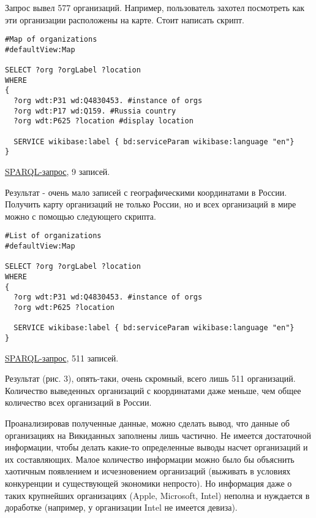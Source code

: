 Запрос вывел 577 организаций. Например, пользователь захотел посмотреть как эти организации расположены на карте. Стоит написать скрипт.

\begin{lstlisting}[language=SPARQL]
#Map of organizations 
#defaultView:Map

SELECT ?org ?orgLabel ?location
WHERE
{
  ?org wdt:P31 wd:Q4830453. #instance of orgs
  ?org wdt:P17 wd:Q159. #Russia country
  ?org wdt:P625 ?location #display location

  SERVICE wikibase:label { bd:serviceParam wikibase:language "en"}
}
\end{lstlisting}

\href{https://query.wikidata.org/#%23List%20of%20organisations%20%0A%23defaultView%3AMap%0A%0ASELECT%20%3Forg%20%3ForgLabel%20%3Flocation%0AWHERE%0A%7B%0A%20%20%3Forg%20wdt%3AP31%20wd%3AQ4830453.%20%23instance%20of%20orgs%0A%20%20%3Forg%20wdt%3AP17%20wd%3AQ159.%20%23Russia%20country%0A%20%20%3Forg%20wdt%3AP625%20%3Flocation%0A%0A%20%20SERVICE%20wikibase%3Alabel%20%7B%20bd%3AserviceParam%20wikibase%3Alanguage%20%22en%22%7D%0A%7D}{SPARQL-запрос}, 9 записей.

Результат - очень мало записей с географическими координатами в России. Получить карту организаций не только России, но и всех организаций в мире можно с помощью следующего скрипта.

\begin{lstlisting}[language=SPARQL]
#List of organizations 
#defaultView:Map

SELECT ?org ?orgLabel ?location
WHERE
{
  ?org wdt:P31 wd:Q4830453. #instance of orgs
  ?org wdt:P625 ?location

  SERVICE wikibase:label { bd:serviceParam wikibase:language "en"}
}
\end{lstlisting}

\href{https://query.wikidata.org/#%23List%20of%20organisations%20%0A%23defaultView%3AMap%0A%0ASELECT%20%3Forg%20%3ForgLabel%20%3Flocation%0AWHERE%0A%7B%0A%20%20%3Forg%20wdt%3AP31%20wd%3AQ4830453.%20%23instance%20of%20orgs%0A%20%20%3Forg%20wdt%3AP625%20%3Flocation%0A%0A%20%20SERVICE%20wikibase%3Alabel%20%7B%20bd%3AserviceParam%20wikibase%3Alanguage%20%22en%22%7D%0A%7D}{SPARQL-запрос}, 511 записей.

Результат (рис. 3), опять-таки, очень скромный, всего лишь 511 организаций. Количество выведенных организаций с координатами даже меньше, чем общее количество всех организаций в России.

Проанализировав полученные данные, можно сделать вывод, что данные об организациях на Викиданных заполнены лишь частично. Не имеется достаточной информации, чтобы делать какие-то определенные выводы насчет организаций и их составляющих. Малое количество информации можно было бы объяснить хаотичным появлением и исчезновением организаций (выживать в условиях конкуренции и существующей экономики непросто). Но информация даже о таких крупнейших организациях (Apple, Microsoft, Intel) неполна и нуждается в доработке (например, у организации Intel не имеется девиза).
